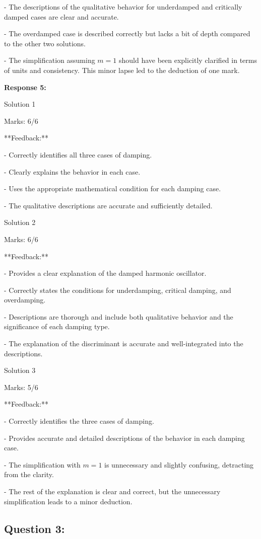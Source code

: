 \documentclass[a4paper,11pt]{article}
\begin{document}
- The descriptions of the qualitative behavior for underdamped and critically damped cases are clear and accurate.

- The overdamped case is described correctly but lacks a bit of depth compared to the other two solutions.

- The simplification assuming \(m=1\) should have been explicitly clarified in terms of units and consistency. This minor lapse led to the deduction of one mark.

\bigskip
\textbf{Response 5:}

Solution 1

Marks: 6/6

**Feedback:**

- Correctly identifies all three cases of damping.

- Clearly explains the behavior in each case.

- Uses the appropriate mathematical condition for each damping case.

- The qualitative descriptions are accurate and sufficiently detailed.

Solution 2

Marks: 6/6

**Feedback:**

- Provides a clear explanation of the damped harmonic oscillator.

- Correctly states the conditions for underdamping, critical damping, and overdamping.

- Descriptions are thorough and include both qualitative behavior and the significance of each damping type.

- The explanation of the discriminant is accurate and well-integrated into the descriptions.

Solution 3

Marks: 5/6

**Feedback:**

- Correctly identifies the three cases of damping.

- Provides accurate and detailed descriptions of the behavior in each damping case.

- The simplification with \( m=1 \) is unnecessary and slightly confusing, detracting from the clarity.

- The rest of the explanation is clear and correct, but the unnecessary simplification leads to a minor deduction.

\subsection*{Question 3:}
\end{document}

